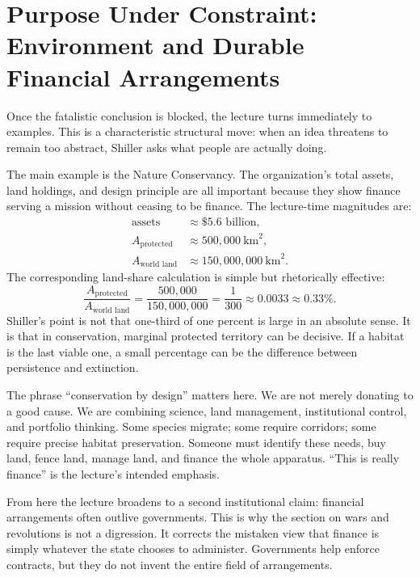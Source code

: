 \section{Purpose Under Constraint: Environment and Durable Financial Arrangements}

Once the fatalistic conclusion is blocked, the lecture turns immediately to examples. This is a characteristic structural move: when an idea threatens to remain too abstract, Shiller asks what people are actually doing.

The main example is the Nature Conservancy. The organization's total assets, land holdings, and design principle are all important because they show finance serving a mission without ceasing to be finance. The lecture-time magnitudes are:
\begin{align}
\text{assets} &\approx \$5.6 \text{ billion},\\
A_{\text{protected}} &\approx 500{,}000\ \text{km}^2,\\
A_{\text{world land}} &\approx 150{,}000{,}000\ \text{km}^2.
\end{align}
The corresponding land-share calculation is simple but rhetorically effective:
\begin{equation}
\frac{A_{\text{protected}}}{A_{\text{world land}}}
=
\frac{500{,}000}{150{,}000{,}000}
=
\frac{1}{300}
\approx 0.0033
\approx 0.33\%.
\end{equation}
Shiller's point is not that one-third of one percent is large in an absolute sense. It is that in conservation, marginal protected territory can be decisive. If a habitat is the last viable one, a small percentage can be the difference between persistence and extinction.

The phrase ``conservation by design'' matters here. We are not merely donating to a good cause. We are combining science, land management, institutional control, and portfolio thinking. Some species migrate; some require corridors; some require precise habitat preservation. Someone must identify these needs, buy land, fence land, manage land, and finance the whole apparatus. ``This is really finance'' is the lecture's intended emphasis.

From here the lecture broadens to a second institutional claim: financial arrangements often outlive governments. This is why the section on wars and revolutions is not a digression. It corrects the mistaken view that finance is simply whatever the state chooses to administer. Governments help enforce contracts, but they do not invent the entire field of arrangements.

